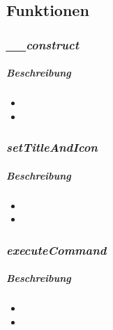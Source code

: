 \paragraph{}
\paragraph{}
\paragraph{}
\paragraph{}
\paragraph{}

\subsection*{Funktionen}

\subsubsection*{\textit{\_\_construct}}\label{constructMGUI}
\subparagraph{Beschreibung}
\begin{itemize}
	\item[] \noindent{} 
	\item[] 
\end{itemize}

\subsubsection*{\textit{setTitleAndIcon}}\label{setTitleAndIconMGUI}
\subparagraph{Beschreibung}
\begin{itemize}
	\item[] \noindent{} 
	\item[] 
\end{itemize}

\subsubsection*{\textit{executeCommand}}\label{executeCommandMGUI}
\subparagraph{Beschreibung}
\begin{itemize}
	\item[] \noindent{} 
	\item[] 
\end{itemize}

